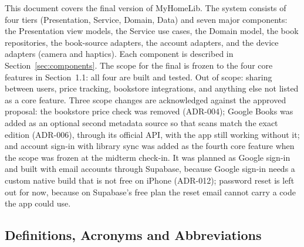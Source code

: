 \documentclass[12pt]{article}
\begin{document}
This document covers the final version of MyHomeLib. The system consists of four tiers (Presentation, Service, Domain, Data) and seven major components: the Presentation view models, the Service use cases, the Domain model, the book repositories, the book-source adapters, the account adapters, and the device adapters (camera and haptics). Each component is described in Section~\ref{sec:components}. The scope for the final is frozen to the four core features in Section~1.1: all four are built and tested. Out of scope: sharing between users, price tracking, bookstore integrations, and anything else not listed as a core feature. Three scope changes are acknowledged against the approved proposal: the bookstore price check was removed (ADR-004); Google Books was added as an optional second metadata source so that scans match the exact edition (ADR-006), through its official API, with the app still working without it; and account sign-in with library sync was added as the fourth core feature when the scope was frozen at the midterm check-in. It was planned as Google sign-in and built with email accounts through Supabase, because Google sign-in needs a custom native build that is not free on iPhone (ADR-012); password reset is left out for now, because on Supabase's free plan the reset email cannot carry a code the app could use.

\subsection{Definitions, Acronyms and Abbreviations}
\end{document}

